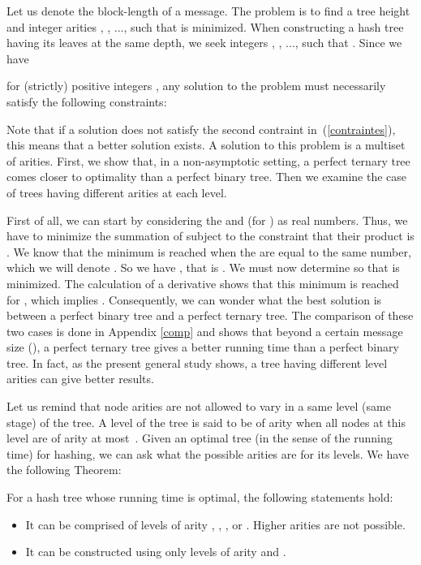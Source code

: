 \documentclass{llncs}
\begin{document}
Let us denote  the block-length of a message. The problem is to find a tree height  and integer arities , , ...,  
such that  is minimized. When constructing a hash tree having its leaves at the same depth,
we seek integers , , ...,  such that .
Since we have 

for (strictly) positive integers ,
any solution to the problem must necessarily satisfy the following constraints:


Note that if a solution  does not satisfy the second contraint in~(\ref{contraintes}), this means that a better solution
exists. A solution to this problem is a multiset of arities.
First, we show that, in a non-asymptotic setting, 
a perfect ternary tree 
comes closer to optimality 
than a perfect binary tree.
Then we examine the case of trees having different arities at each level.



First of all, we can start by considering the  and  (for ) as real numbers. Thus, 
we have to minimize the summation of  subject to the constraint that their product is . 
We know that the minimum is reached when the 
are equal to the same number, which we will denote . So we have
, that is . We must now determine
 so that  is minimized.
The calculation of a derivative shows that this minimum is reached for ,
which implies . 
Consequently, we can wonder what the best solution is between a perfect binary tree and a perfect ternary tree.
The comparison of these two cases is done in Appendix \ref{comp} and shows that
beyond a certain message size  (), a perfect ternary tree gives a better running time than a perfect binary tree.
In fact, as the present general study shows, a tree having different level arities can give better results.





Let us remind that node arities are not allowed to vary in a same level (same stage) of the tree.
A level of the tree is said to be of arity  when all nodes at this level are of arity at most~.
Given an optimal tree (in the sense of the running time) for hashing, we can ask what the possible arities are for its levels. 
We have the following Theorem:

\begin{theorem}\label{arites}
For a hash tree whose running time is optimal, the following statements hold: 
\begin{itemize}
 \item It can be comprised of levels of arity , , , or . Higher arities are not possible.
 \item It can be constructed using only levels of arity  and .
\end{itemize}
\end{theorem}
\end{document}
